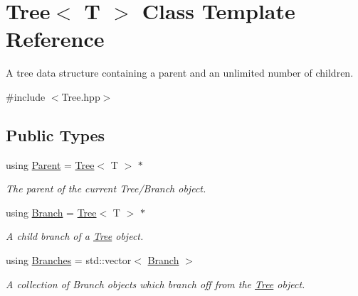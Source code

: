 \hypertarget{classTree}{\section{Tree$<$ T $>$ Class Template Reference}
\label{classTree}
}


A tree data structure containing a parent and an unlimited number of children.  




{\ttfamily \#include $<$Tree.\+hpp$>$}

\subsection*{Public Types}
\begin{DoxyCompactItemize}
\item 
using \hyperlink{classTree_a90c6da3cbc82d2a2652e7ceb19ef8f6a}{Parent} = \hyperlink{classTree}{Tree}$<$ T $>$ $\ast$
\begin{DoxyCompactList}\small\item\em The parent of the current Tree/\+Branch object. \end{DoxyCompactList}\item 
using \hyperlink{classTree_a9acb980cd198358d57fb2a6e5d65c85b}{Branch} = \hyperlink{classTree}{Tree}$<$ T $>$ $\ast$
\begin{DoxyCompactList}\small\item\em A child branch of a \hyperlink{classTree}{Tree} object. \end{DoxyCompactList}\item 
using \hyperlink{classTree_abb3de7e9104700b780c956a6da8a3582}{Branches} = std\+::vector$<$ \hyperlink{classTree_a9acb980cd198358d57fb2a6e5d65c85b}{Branch} $>$
\begin{DoxyCompactList}\small\item\em A collection of Branch objects which branch off from the \hyperlink{classTree}{Tree} object. \end{DoxyCompactList}\end{DoxyCompactItemize}
